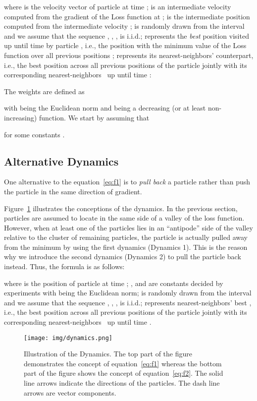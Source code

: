 \documentclass{ieeeaccess}
\begin{document}
where  is the velocity vector of particle  at time ;  is an intermediate velocity computed from the gradient of the Loss function at ;  is the intermediate position computed from the intermediate velocity ;  is randomly drawn from the interval  and we assume that the sequence , , ,  is i.i.d.;  represents the \emph{best} position visited up until time  by particle , i.e., the position with the minimum value of the Loss function over all previous positions ;  represents its nearest-neighbors' counterpart, i.e., the best position across all previous positions of the particle  jointly with its corresponding nearest-neighbors~ up until time : 

The weights  are defined as

with  being the Euclidean norm and  being a decreasing (or at least non-increasing) function. We start by assuming that

for some constants .

\subsection{Alternative Dynamics}
One alternative to the equation~\eqref{eq:f1} is to \emph{pull back} a particle rather than push the particle in the same direction of gradient. 

Figure~\ref{fig:dynamics} illustrates the conceptions of the dynamics. In the previous section, particles are assumed to locate in the same side of a valley of the loss function. However, when at least one of the particles lies in an ``antipode'' side of the valley relative to the cluster of remaining particles, the particle is actually pulled away from the minimum by using the first dynamics (Dynamics 1). This is the reason why we introduce the second dynamics (Dynamics 2) to pull the particle back instead. Thus, the formula is as follows:

where  is the position of particle  at time ; ,  and  are constants decided by experiments with  being the Euclidean norm;  is randomly drawn from the interval  and we assume that the sequence , , ,  is i.i.d.;  represents nearest-neighbors' best , i.e., the best position across all previous positions of the particle  jointly with its corresponding nearest-neighbors~ up until time .
\begin{figure} [hbt]
\begin{center}
\texttt{[image: img/dynamics.png]}
\caption{Illustration of the Dynamics. The top part of the figure demonstrates the concept of equation~\eqref{eq:f1} whereas the bottom part of the figure shows the concept of equation~\eqref{eq:f2}. The solid line arrows indicate the directions of the particles. The dash line arrows are  vector components.
}\label{fig:dynamics}
\end{center}
\end{figure}
\end{document}
